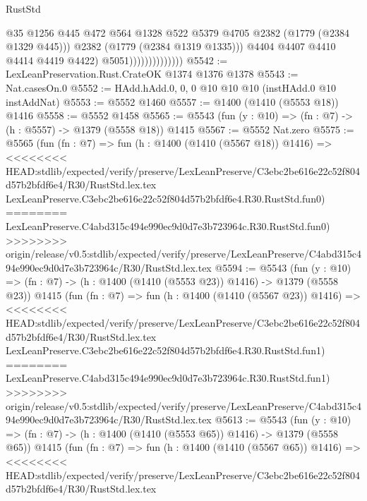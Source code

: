 \begin{lexlean}{RustStd}
\begin{coremodule}
{\begin{coremodule}
{{{{{{{{{{{                                      @35
                                      @1256
                                      @445
                                      @472
                                      @564
                                      @1328
                                      @522
                                      @5379
                                      @4705
                                      @2382
                                      (@1779 (@2384 @1329 @445)))
                                    @2382
                                    (@1779 (@2384 @1319 @1335)))
                                  @4404
                                  @4407
                                  @4410
                                  @4414
                                  @4419
                                  @4422)
                                @5051))))))))))))))
@5542 := LexLeanPreservation.Rust.CrateOK @1374 @1376 @1378
@5543 := Nat.casesOn.{0}
@5552 := HAdd.hAdd.{0, 0, 0} @10 @10 @10 (instHAdd.{0} @10 instAddNat)
@5553 := @5552 @1460
@5557 := @1400 (@1410 (@5553 @18)) @1416
@5558 := @5552 @1458
@5565 := @5543 (fun (y : @10) => (fn : @7) -> (h : @5557) -> @1379 (@5558 @18)) @1415
@5567 := @5552 Nat.zero
@5575 := @5565
    (fun (fn : @7) =>
    fun (h : @1400 (@1410 (@5567 @18)) @1416) =>
<<<<<<<< HEAD:stdlib/expected/verify/preserve/LexLeanPreserve/C3ebc2be616e22c52f804d57b2bfdf6e4/R30/RustStd.lex.tex
    LexLeanPreserve.C3ebc2be616e22c52f804d57b2bfdf6e4.R30.RustStd.fun0)
========
    LexLeanPreserve.C4abd315c494e990ec9d0d7e3b723964c.R30.RustStd.fun0)
>>>>>>>> origin/release/v0.5:stdlib/expected/verify/preserve/LexLeanPreserve/C4abd315c494e990ec9d0d7e3b723964c/R30/RustStd.lex.tex
@5594 := @5543
    (fun (y : @10) => (fn : @7) -> (h : @1400 (@1410 (@5553 @23)) @1416) -> @1379 (@5558 @23))
    @1415
    (fun (fn : @7) =>
    fun (h : @1400 (@1410 (@5567 @23)) @1416) =>
<<<<<<<< HEAD:stdlib/expected/verify/preserve/LexLeanPreserve/C3ebc2be616e22c52f804d57b2bfdf6e4/R30/RustStd.lex.tex
    LexLeanPreserve.C3ebc2be616e22c52f804d57b2bfdf6e4.R30.RustStd.fun1)
========
    LexLeanPreserve.C4abd315c494e990ec9d0d7e3b723964c.R30.RustStd.fun1)
>>>>>>>> origin/release/v0.5:stdlib/expected/verify/preserve/LexLeanPreserve/C4abd315c494e990ec9d0d7e3b723964c/R30/RustStd.lex.tex
@5613 := @5543
    (fun (y : @10) => (fn : @7) -> (h : @1400 (@1410 (@5553 @65)) @1416) -> @1379 (@5558 @65))
    @1415
    (fun (fn : @7) =>
    fun (h : @1400 (@1410 (@5567 @65)) @1416) =>
<<<<<<<< HEAD:stdlib/expected/verify/preserve/LexLeanPreserve/C3ebc2be616e22c52f804d57b2bfdf6e4/R30/RustStd.lex.tex
}}}}}}}}}}}
\end{coremodule}}
\end{coremodule}
\end{lexlean}
